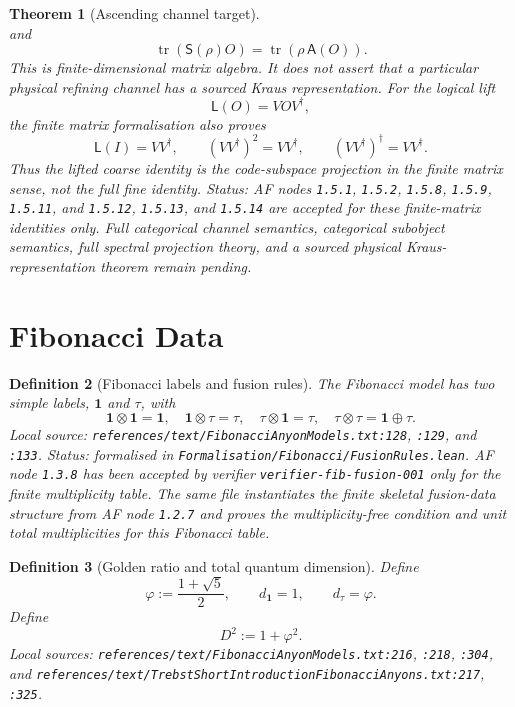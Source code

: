 \documentclass[11pt]{article}
\newtheorem{definition}{Definition}[section]
\newtheorem{theorem}[definition]{Theorem}
\begin{document}
\begin{theorem}[Ascending channel target]
\[\]
and
\[
\operatorname{tr}(\mathsf S(\rho)O)
=\operatorname{tr}(\rho\,\mathsf A(O)).
\]
This is finite-dimensional matrix algebra. It does not assert that a
particular physical refining channel has a sourced Kraus representation. For
the logical lift
\[
\mathsf L(O)=VOV^\dagger,
\]
the finite matrix formalisation also proves
\[
\mathsf L(I)=VV^\dagger,\qquad
(VV^\dagger)^2=VV^\dagger,\qquad
(VV^\dagger)^\dagger=VV^\dagger.
\]
Thus the lifted coarse identity is the code-subspace projection in the finite
matrix sense, not the full fine identity. Status: AF nodes \texttt{1.5.1},
\texttt{1.5.2}, \texttt{1.5.8}, \texttt{1.5.9}, \texttt{1.5.11}, and
\texttt{1.5.12}, \texttt{1.5.13}, and \texttt{1.5.14} are accepted for these finite-matrix
identities only. Full categorical channel semantics, categorical subobject
semantics, full spectral projection theory, and a sourced physical
Kraus-representation theorem remain pending.
\end{theorem}

\section{Fibonacci Data}

\begin{definition}[Fibonacci labels and fusion rules]
The Fibonacci model has two simple labels, \(\mathbf 1\) and \(\tau\), with
\[
\mathbf 1\otimes\mathbf 1=\mathbf 1,\quad
\mathbf 1\otimes\tau=\tau,\quad
\tau\otimes\mathbf 1=\tau,\quad
\tau\otimes\tau=\mathbf 1\oplus\tau.
\]
Local source: \texttt{references/text/FibonacciAnyonModels.txt:128},
\texttt{:129}, and \texttt{:133}. Status: formalised in
\texttt{Formalisation/Fibonacci/FusionRules.lean}. AF node \texttt{1.3.8}
has been accepted by verifier \texttt{verifier-fib-fusion-001} only for the
finite multiplicity table. The same file instantiates the finite skeletal
fusion-data structure from AF node \texttt{1.2.7} and proves the
multiplicity-free condition and unit total multiplicities for this Fibonacci
table.
\end{definition}

\begin{definition}[Golden ratio and total quantum dimension]
Define
\[
\varphi:=\frac{1+\sqrt 5}{2},\qquad d_{\mathbf 1}=1,\qquad d_\tau=\varphi.
\]
Define
\[
D^2:=1+\varphi^2.
\]
Local sources: \texttt{references/text/FibonacciAnyonModels.txt:216},
\texttt{:218}, \texttt{:304}, and
\texttt{references/text/TrebstShortIntroductionFibonacciAnyons.txt:217},
\texttt{:325}.
\end{definition}
\end{document}
